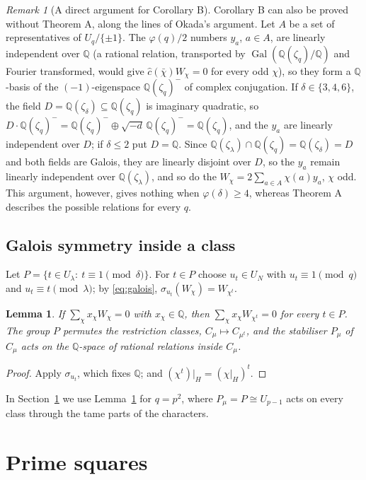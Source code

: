 \documentclass[11pt]{amsart}
\newtheorem{lemma}[theorem]{Lemma}
\theoremstyle{definition}
\theoremstyle{remark}
\newtheorem{remark}[theorem]{Remark}
\providecommand{\Q}{\mathbb Q}
\DeclareMathOperator{\Gal}{Gal}
\numberwithin{equation}{section}
\begin{document}
\begin{remark}[A direct argument for Corollary B]\label{rem:direct}
Corollary B can also be proved without Theorem A, along the lines of Okada's argument.
Let $A$ be a set of representatives of $U_q/\{\pm1\}$.
The $\varphi(q)/2$ numbers $y_a$, $a\in A$, are linearly independent over $\Q$ (a rational relation, transported by $\Gal(\Q(\zeta_q)/\Q)$ and Fourier transformed, would give $\hat c(\bar\chi)W_\chi=0$ for every odd $\chi$), so they form a $\Q$-basis of the $(-1)$-eigenspace $\Q(\zeta_q)^-$ of complex conjugation.
If $\delta\in\{3,4,6\}$, the field $D=\Q(\zeta_\delta)\subseteq\Q(\zeta_q)$ is imaginary quadratic, so $D\cdot\Q(\zeta_q)^-=\Q(\zeta_q)^-\oplus\sqrt{-d}\,\Q(\zeta_q)^-=\Q(\zeta_q)$, and the $y_a$ are linearly independent over $D$; if $\delta\le2$ put $D=\Q$.
Since $\Q(\zeta_\lambda)\cap\Q(\zeta_q)=\Q(\zeta_\delta)=D$ and both fields are Galois, they are linearly disjoint over $D$, so the $y_a$ remain linearly independent over $\Q(\zeta_\lambda)$, and so do the $W_\chi=2\sum_{a\in A}\chi(a)y_a$, $\chi$ odd.
This argument, however, gives nothing when $\varphi(\delta)\ge4$, whereas Theorem A describes the possible relations for every $q$.
\end{remark}

\subsection{Galois symmetry inside a class}
Let $P=\{t\in U_\lambda:\ t\equiv1\pmod\delta\}$.
For $t\in P$ choose $u_t\in U_N$ with $u_t\equiv1\pmod q$ and $u_t\equiv t\pmod\lambda$; by \eqref{eq:galois}, $\sigma_{u_t}(W_\chi)=W_{\chi^t}$.

\begin{lemma}\label{lem:Psym}
If $\sum_\chi x_\chi W_\chi=0$ with $x_\chi\in\Q$, then $\sum_\chi x_\chi W_{\chi^t}=0$ for every $t\in P$.
The group $P$ permutes the restriction classes, $C_\mu\mapsto C_{\mu^t}$, and the stabiliser $P_\mu$ of $C_\mu$ acts on the $\Q$-space of rational relations inside $C_\mu$.
\end{lemma}

\begin{proof}
Apply $\sigma_{u_t}$, which fixes $\Q$; and $(\chi^t)|_H=(\chi|_H)^t$.
\end{proof}

In Section~\ref{sec:psquare} we use Lemma~\ref{lem:Psym} for $q=p^2$, where $P_\mu=P\cong U_{p-1}$ acts on every class through the tame parts of the characters.
\section{Prime squares}\label{sec:psquare}
\end{document}
